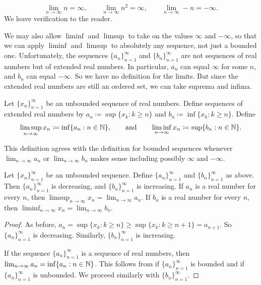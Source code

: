 \begin{example}
\begin{equation*}
\lim_{n\to \infty} n = \infty,
\qquad
\lim_{n\to \infty} n^2 = \infty,
\qquad
\lim_{n\to \infty} -n = -\infty.
\end{equation*}
We leave verification to the reader.
\end{example}

We may also allow $\liminf$ and $\limsup$ to take on
the values $\infty$ and $-\infty$, so that
we can apply $\liminf$ and $\limsup$
to absolutely any sequence, not just
a bounded one.   Unfortunately, the sequences $\{ a_n \}_{n=1}^\infty$ and
$\{ b_n \}_{n=1}^\infty$
are not sequences of real numbers but of extended real numbers.  In
particular, $a_n$ can equal $\infty$ for some $n$, and $b_n$ can equal
$-\infty$.  So we have no definition for the limits.
But since the extended real numbers are still an ordered set, we
can take suprema and infima.

\begin{defn}
Let $\{ x_n \}_{n=1}^\infty$ be an unbounded sequence of real numbers.  Define
sequences of extended real numbers by
$a_n \coloneqq \sup \{ x_k : k \geq n \}$ and
$b_n \coloneqq \inf \{ x_k : k \geq n \}$.
Define
\begin{equation*}
\limsup_{n \to \infty} x_n \coloneqq \inf \{ a_n : n \in {\mathbb{N}} \}, \qquad \text{and} \qquad
\liminf_{n \to \infty} x_n \coloneqq \sup \{ b_n : n \in {\mathbb{N}} \}.
\end{equation*}
\end{defn}

This definition agrees with the definition for bounded
sequences whenever $\lim_{n\to\infty} a_n$ or $\lim_{n\to\infty} b_n$ makes sense including
possibly $\infty$ and $-\infty$.

\begin{prop}
Let $\{ x_n \}_{n=1}^\infty$ be an unbounded sequence.  Define
$\{ a_n \}_{n=1}^\infty$ and $\{ b_n \}_{n=1}^\infty$ as above.
Then $\{ a_n \}_{n=1}^\infty$ is decreasing, and $\{ b_n \}_{n=1}^\infty$ is increasing.
If $a_n$ is a real number for every $n$, then
$\limsup_{n\to\infty} x_n = \lim_{n\to\infty} a_n$.
If $b_n$ is a real number for every $n$, then
$\liminf_{n\to\infty} x_n = \lim_{n\to\infty} b_n$.
\end{prop}

\begin{proof}
As before,
$a_n = \sup \{ x_k : k \geq n \} \geq \sup \{ x_k : k \geq n+1 \} =
a_{n+1}$.  So $\{ a_n \}_{n=1}^\infty$ is decreasing. Similarly,
$\{ b_n \}_{n=1}^\infty$ is increasing.

If the sequence $\{ a_n \}_{n=1}^\infty$ is a sequence of real numbers, then
$\lim_{n\to\infty} a_n = \inf \{ a_n : n \in {\mathbb{N}} \}$.  This follows from
 if $\{ a_n \}_{n=1}^\infty$ is bounded and
 if $\{a_n \}_{n=1}^\infty$
is unbounded.  We proceed similarly with $\{ b_n \}_{n=1}^\infty$.
\end{proof}


